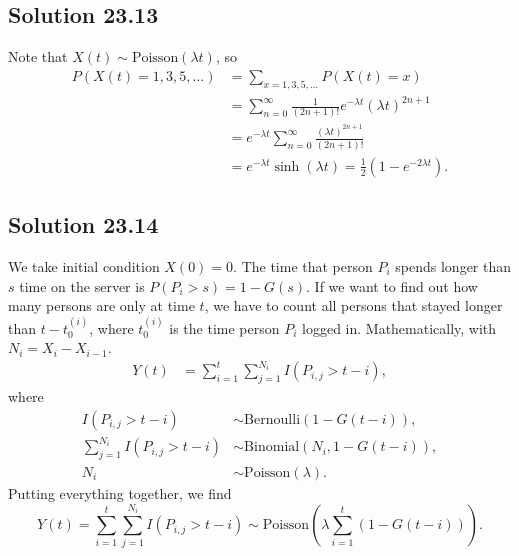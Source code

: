 \subsection*{Solution 23.13}

Note that $X(t) \sim \mathrm{Poisson}(\lambda t)$, so
\begin{equation*}
    \begin{split}
        P(X(t) = 1, 3, 5, ...)
            &= \sum_{x = 1, 3, 5, ...} P(X(t) = x) \\
            &= \sum_{n = 0}^{\infty} \frac{1}{(2n + 1)!} e^{-\lambda t} (\lambda t)^{2n + 1} \\
            &= e^{-\lambda t} \sum_{n = 0}^{\infty} \frac{(\lambda t)^{2n + 1}}{(2n + 1)!} \\
            &= e^{-\lambda t} \sinh(\lambda t)
            = \frac{1}{2}(1 - e^{-2 \lambda t}).
    \end{split}
\end{equation*}


\subsection*{Solution 23.14}

We take initial condition $X(0) = 0$.
The time that person $P_i$ spends longer than $s$ time on the server is $P(P_i > s) = 1 - G(s)$.
If we want to find out how many persons are only at time $t$, we have to count all persons that stayed longer than $t - t_0^{(i)}$, where $t_0^{(i)}$ is the time person $P_i$ logged in.
Mathematically, with $N_i = X_{i} - X_{i-1}$.
\begin{equation*}
    \begin{split}
        Y(t) &= \sum_{i = 1}^{t} \sum_{j = 1}^{N_i} I(P_{i, j} > t - i),
    \end{split}
\end{equation*}
where
\begin{equation*}
    \begin{split}
        I(P_{i,j} > t - i) &\sim \mathrm{Bernoulli}(1 - G(t - i)), \\
        \sum_{j = 1}^{N_i} I(P_{i,j} > t - i) &\sim \mathrm{Binomial}(N_i, 1 - G(t - i)), \\
        N_i &\sim \mathrm{Poisson}(\lambda).
    \end{split}
\end{equation*}
Putting everything together, we find
\begin{equation*}
    Y(t) = \sum_{i = 1}^{t} \sum_{j = 1}^{N_i} I(P_{i, j} > t - i)
        \sim \mathrm{Poisson}\left(\lambda \sum_{i = 1}^{t}(1 - G(t - i))\right).
\end{equation*}
